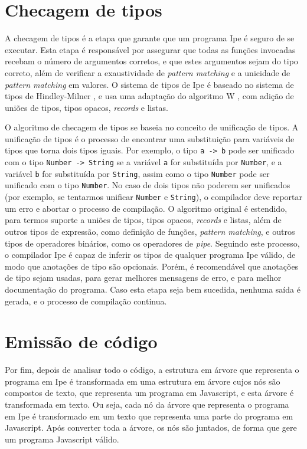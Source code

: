 \section{Checagem de tipos}

A checagem de tipos é a etapa que garante que um programa Ipe é seguro de se executar. Esta etapa é
responsável por assegurar que todas as funções invocadas recebam o número de argumentos corretos, e
que estes argumentos sejam do tipo correto, além de verificar a exaustividade de \textit{pattern matching}
e a unicidade de \textit{pattern matching} em valores. O sistema de tipos de Ipe é baseado no sistema
de tipos de Hindley-Milner \cite{principaltypeschemes}, e usa uma adaptação do algoritmo W \cite{understaingalgorithmw},
com adição de uniões de tipos, tipos opacos, \textit{records} e listas.

O algoritmo de checagem de tipos se baseia no conceito de unificação de tipos. A unificação de tipos
é o processo de encontrar uma substituição para variáveis de tipos que torna dois tipos iguais. Por
exemplo, o tipo \texttt{a -> b} pode ser unificado com o tipo \texttt{Number -> String} se a variável
\texttt{a} for substituída por \texttt{Number}, e a variável \texttt{b} for substituída por
\texttt{String}, assim como o tipo \texttt{Number} pode ser unificado com o tipo \texttt{Number}.
No caso de dois tipos não poderem ser unificados (por exemplo, se tentarmos unificar \texttt{Number}
e \texttt{String}), o compilador deve reportar um erro e abortar o processo de compilação. O algoritmo
original é estendido, para termos suporte a uniões de tipos, tipos opacos, \textit{records} e listas,
além de outros tipos de expressão, como definição de funções, \textit{pattern matching}, e outros
tipos de operadores binários, como os operadores de \textit{pipe}. Seguindo este processo, o
compilador Ipe é capaz de inferir os tipos de qualquer programa Ipe válido, de modo que anotações de
tipo são opcionais. Porém, é recomendável que anotações de tipo sejam usadas, para gerar melhores
mensagens de erro, e para melhor documentação do programa. Caso esta etapa seja bem sucedida, nenhuma
saída é gerada, e o processo de compilação continua.


\section{Emissão de código}

Por fim, depois de analisar todo o código, a estrutura em árvore que representa o programa em Ipe é
transformada em uma estrutura em árvore cujos nós são compostos de texto, que representa um programa
em Javascript, e esta árvore é transformada em texto. Ou seja, cada nó da árvore que representa o
programa em Ipe é transformado em um texto que representa uma parte do programa em Javascript. Após
converter toda a árvore, os nós são juntados, de forma que gere um programa Javascript válido.


